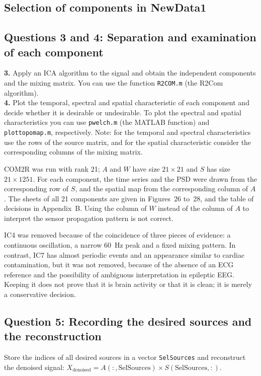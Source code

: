 \subsection*{Selection of components in NewData1}
\subsection*{Questions 3 and 4: Separation and examination of each component}
\begin{taskbox}
\textbf{3.} Apply an ICA algorithm to the signal and obtain the independent components and the mixing matrix. You can use the function \texttt{R2COM.m} (the R2Com algorithm).\\
\textbf{4.} Plot the temporal, spectral and spatial characteristic of each component and decide whether it is desirable or undesirable. To plot the spectral and spatial characteristics you can use \texttt{pwelch.m} (the MATLAB function) and \texttt{plottopomap.m}, respectively. Note: for the temporal and spectral characteristics use the rows of the source matrix, and for the spatial characteristic consider the corresponding columns of the mixing matrix.
\end{taskbox}

COM2R was run with rank 21; $A$ and $W$ have size $21\times21$ and $S$ has size $21\times1251$. For each component, the time series and the PSD were drawn from the corresponding row of $S$, and the spatial map from the corresponding column of $A$. The sheets of all 21 components are given in Figures~26 to~28, and the table of decisions in Appendix~B. Using the column of $W$ instead of the column of $A$ to interpret the sensor propagation pattern is not correct.

IC4 was removed because of the coincidence of three pieces of evidence: a continuous oscillation, a narrow 60~Hz peak and a fixed mixing pattern. In contrast, IC7 has almost periodic events and an appearance similar to cardiac contamination, but it was not removed, because of the absence of an ECG reference and the possibility of ambiguous interpretation in epileptic EEG. Keeping it does not prove that it is brain activity or that it is clean; it is merely a conservative decision.

\subsection*{Question 5: Recording the desired sources and the reconstruction}
\begin{taskbox}
Store the indices of all desired sources in a vector \texttt{SelSources} and reconstruct the denoised signal: $X_{\mathrm{denoised}}=A(:,\mathrm{SelSources})\times S(\mathrm{SelSources},:)$.
\end{taskbox}

